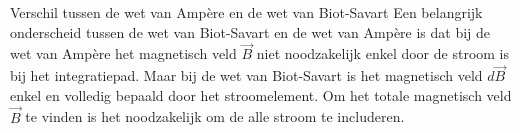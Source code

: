 \begin{vrg}{Verschil tussen de wet van Ampère en de wet van Biot-Savart}
    Een belangrijk onderscheid tussen de wet van Biot-Savart en de wet van Ampère is dat bij de wet van Ampère
    het magnetisch veld $\Vec{B}$ niet noodzakelijk enkel door de stroom is bij het integratiepad. Maar bij de wet
    van Biot-Savart is het magnetisch veld $d\Vec{B}$ enkel en volledig bepaald door het stroomelement.
    Om het totale magnetisch veld $\Vec{B}$ te vinden is het noodzakelijk om de alle stroom te includeren.
\end{vrg}

\newpage
